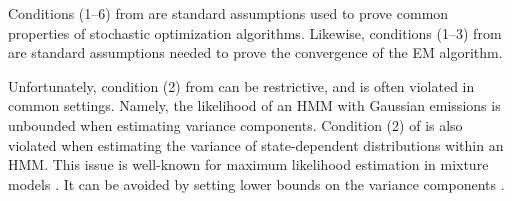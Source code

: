 Conditions (1--6) from \citet{Johnson:2013} are standard assumptions used to prove common properties of stochastic optimization algorithms. Likewise, conditions (1--3) from \citet{Wu:1983} are standard assumptions needed to prove the convergence of the EM algorithm. 

Unfortunately, condition (2) from \citet{Wu:1983} can be restrictive, and is often violated in common settings. Namely, the likelihood of an HMM with Gaussian emissions is unbounded when estimating variance components. Condition (2) of \citet{Johnson:2013} is also violated when estimating the variance of state-dependent distributions within an HMM. This issue is well-known for maximum likelihood estimation in mixture models \citep{Chen:2009,Liu:2015b}. It can be avoided by setting lower bounds on the variance components \citep{Zucchini:2016}. %




%
%

